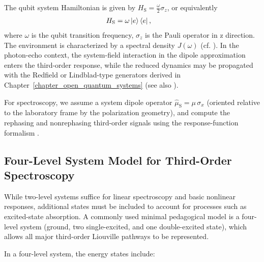 The qubit system Hamiltonian is given by $H_{\mathrm{S}} = \frac{\omega}{2} \sigma_z$, or equivalently
\begin{align}
	H_{\mathrm{S}} & = \omega \ket{e}\bra{e} ,
	\label{eq:qubit_system}
\end{align}
where $\omega$ is the qubit transition frequency, $\sigma_z$ is the Pauli operator in z direction.
The environment is characterized by a spectral density $J(\omega)$ (cf. \cite{breuerpetruccione2009theoryopenquantum,ritscheleisfeld2014analyticrepresentationsbath}). In the photon-echo context, the system-field interaction in the dipole approximation enters the third-order response, while the reduced dynamics may be propagated with the Redfield or Lindblad-type generators derived in Chapter~\ref{chapter_open_quantum_systems} (see also \cite{campaiolietal2024quantummasterequations,manzano2020shortintroductionlindblad}).

For spectroscopy, we assume a system dipole operator $\hat{\mu}_{\mathrm{S}} = \mu\,\sigma_x$ (oriented relative to the laboratory frame by the polarization geometry), and compute the rephasing and nonrephasing third-order signals using the response-function formalism \cite{mukamel1995principlesnonlinearoptical,jonas2003twodimensionalfemtosecondspectroscopy}.


\subsection{Four-Level System Model for Third-Order Spectroscopy}
\label{subsec:four_level_model}

\noindent While two-level systems suffice for linear spectroscopy and basic nonlinear responses, additional states must be included to account for processes such as excited-state absorption. A commonly used minimal pedagogical model is a four-level system (ground, two single-excited, and one double-excited state), which allows all major third-order Liouville pathways to be represented\cite{cho2009twodimensionalopticalspectroscopy, abramaviciusetal2009coherentmultidimensionaloptical}.

\noindent In a four-level system, the energy states include:

